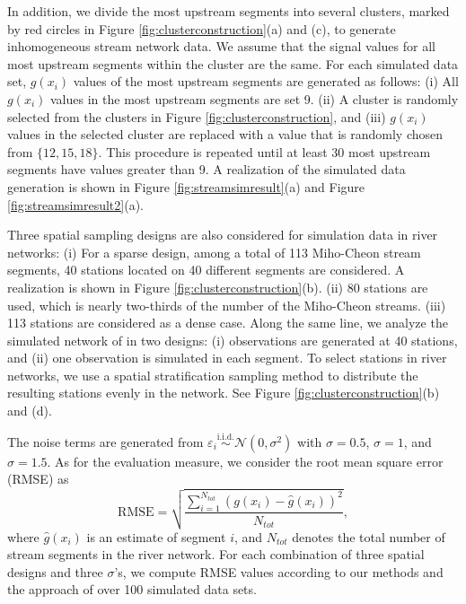 \documentclass[11pt,titlepage]{article}
\begin{document}
In addition, we divide the most upstream segments into several clusters, marked by red circles in Figure \ref{fig:clusterconstruction}(a) and (c), to generate inhomogeneous stream network data. We assume that the signal values for all most upstream segments within the cluster are the same. For each simulated data set, $g(x_i)$ values of the most upstream segments are generated as follows: (i) All $g(x_i)$ values in the most upstream segments are set  9. (ii) A cluster is randomly selected from the clusters in Figure  \ref{fig:clusterconstruction}, and (iii) $g(x_i)$ values in the selected cluster are replaced with a value that is randomly chosen from $\{12, 15, 18\}$. This procedure is repeated until at least 30 most upstream segments have values greater than 9. A realization of the simulated data generation is shown in Figure \ref{fig:streamsimresult}(a) and Figure \ref{fig:streamsimresult2}(a).

Three spatial sampling designs are also considered for simulation data in river networks: (i) For a sparse design, among a total of 113 Miho-Cheon stream segments, 40 stations located on 40 different segments are considered. A realization is shown in Figure \ref{fig:clusterconstruction}(b). (ii) 80 stations are used, which is nearly two-thirds of the number of the Miho-Cheon streams. (iii) 113 stations are considered as a dense case. Along the same line, we analyze the simulated network of \cite{Gallacher2017} in two designs: (i) observations are generated at 40 stations, and (ii) one observation is simulated in each segment. To select stations in river networks, we use a spatial stratification sampling method to distribute the resulting stations evenly in the network. See Figure \ref{fig:clusterconstruction}(b) and (d).

The noise terms are generated from $\varepsilon_{i} \stackrel{\text{i.i.d.}}{\sim} \mathcal{N}(0,\sigma^{2})$ with $\sigma=0.5$,  $\sigma=1$, and $\sigma=1.5$. As for the evaluation measure, we consider the root mean square error (RMSE) as 
\[
\text{RMSE}=\sqrt{\frac{\sum_{i=1}^{N_{tot}} (g(x_i)-\hat{g}(x_i))^{2}} {N_{tot}}},
\]
where $\hat{g}(x_i)$ is an estimate of segment $i$, and $N_{tot}$ denotes the total number of stream segments in the river network. For each combination of three spatial designs and three $\sigma$'s, we compute RMSE values according to our methods and the approach of \cite{ODonnell2014} over 100 simulated data sets. 
\end{document}

